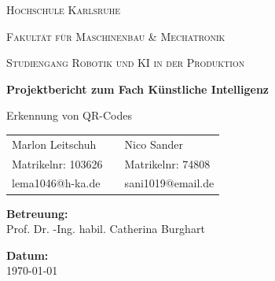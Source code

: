 \documentclass[
    a4paper,        %
    11pt,           %
    ngerman,        %
    parskip=half,   %
    listof=totoc,   %
    bibliography=totoc %
]{scrartcl}
\begin{document}
\begin{titlepage}
    \centering
    \vspace{2cm}
    
    {\scshape\LARGE Hochschule Karlsruhe \par}
    \vspace{1cm}
    {\scshape\Large Fakultät für Maschinenbau \& Mechatronik \par}
    {\scshape\Large Studiengang Robotik und KI in der Produktion \par}
    \vspace{1.5cm}
    
    {\huge\bfseries Projektbericht zum Fach Künstliche Intelligenz \par}
    \vspace{0.5cm}
    {\Large Erkennung von QR-Codes \par}
    
    \vspace{2cm}
    
    \vspace{2cm}
    \begin{center}
        \begin{tabular}{l p{2cm} l}
            Marlon Leitschuh    & & Nico Sander \\
            Matrikelnr: 103626  & & Matrikelnr: 74808 \\
            lema1046@h-ka.de    & & sani1019@email.de \\
        \end{tabular}
    \end{center}

    \vfil

    \textbf{Betreuung:} \\
    Prof. Dr. -Ing. habil. Catherina Burghart

    \vspace{0.8cm}
    
    \textbf{Datum:} \\
    \today
    
\end{titlepage}

\tableofcontents            %
\newpage
\end{document}
